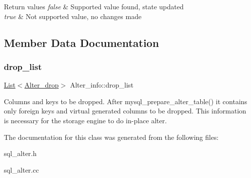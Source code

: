 \begin{DoxyRetVals}{Return values}
{\em false} & Supported value found, state updated \\
\hline
{\em true} & Not supported value, no changes made \\
\hline
\end{DoxyRetVals}


\subsection{Member Data Documentation}
\mbox{\label{classAlter__info_a4bc7d6d9511a71d514d57cd07c9cafe8}} 
\subsubsection{\texorpdfstring{drop\+\_\+list}{drop\_list}}
{\footnotesize\ttfamily \mbox{\hyperlink{classList}{List}}$<$\mbox{\hyperlink{classAlter__drop}{Alter\+\_\+drop}}$>$ Alter\+\_\+info\+::drop\+\_\+list}

Columns and keys to be dropped. After mysql\+\_\+prepare\+\_\+alter\+\_\+table() it contains only foreign keys and virtual generated columns to be dropped. This information is necessary for the storage engine to do in-\/place alter. 

The documentation for this class was generated from the following files\+:\begin{DoxyCompactItemize}
\item 
sql\+\_\+alter.\+h\item 
sql\+\_\+alter.\+cc\end{DoxyCompactItemize}
